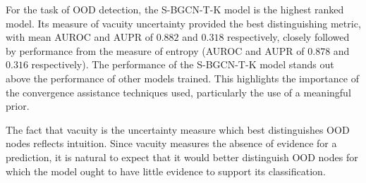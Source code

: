 \documentclass[
twocolumn,
]{ceurart}
\begin{document}

For the task of OOD detection, the S-BGCN-T-K model is the highest ranked model.
Its measure of vacuity uncertainty provided the best distinguishing metric, with mean AUROC and AUPR of $0.882$ and $0.318$ respectively, closely followed by performance from the measure of entropy (AUROC and AUPR of $0.878$ and $0.316$ respectively).
The performance of the S-BGCN-T-K model stands out above the performance of other models trained.
This highlights the importance of the convergence assistance techniques used, particularly the use of a meaningful prior.

The fact that vacuity is the uncertainty measure which best distinguishes OOD nodes reflects intuition.
Since vacuity measures the absence of evidence for a prediction, it is natural to expect that it would better distinguish OOD nodes for which the model ought to have little evidence to support its classification.
\end{document}
